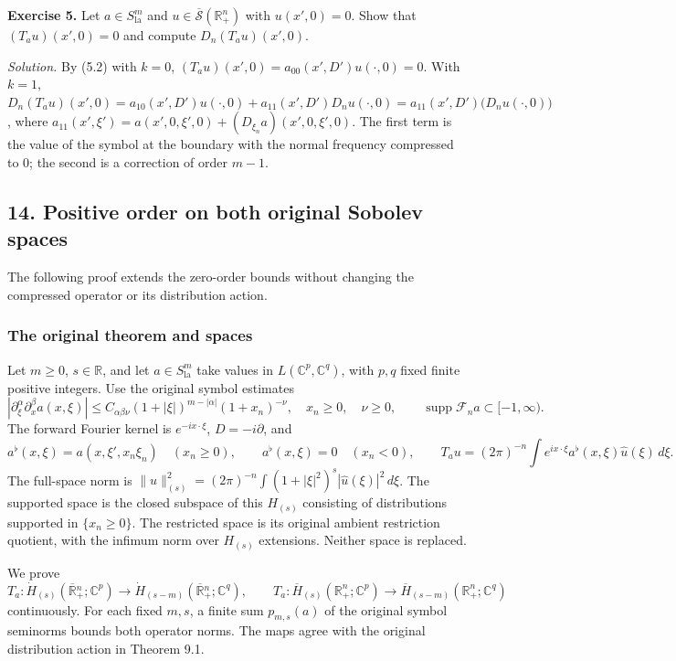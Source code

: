 \documentclass[
  11pt,
]{article}
\begin{document}
\textbf{Exercise 5.} Let \(a\in S^m_{\mathrm{la}}\) and
\(u\in\overline{\mathcal S}(\mathbb R^n_+)\) with \(u(x',0)=0\). Show
that \((T_au)(x',0)=0\) and compute \(D_n(T_au)(x',0)\).

\emph{Solution.} By (5.2) with \(k=0\),
\((T_au)(x',0)=a_{00}(x',D')u(\cdot,0)=0\). With \(k=1\),
\(D_n(T_au)(x',0)=a_{10}(x',D')u(\cdot,0)+a_{11}(x',D')D_nu(\cdot,0)=a_{11}(x',D')\big(D_nu(\cdot,0)\big)\),
where \(a_{11}(x',\xi')=a(x',0,\xi',0)+(D_{\xi_n}a)(x',0,\xi',0)\). The
first term is the value of the symbol at the boundary with the normal
frequency compressed to 0; the second is a correction of order \(m-1\).

\subsection{14. Positive order on both original Sobolev
spaces}\label{positive-order-on-both-original-sobolev-spaces}

The following proof extends the zero-order bounds without changing the
compressed operator or its distribution action.

\subsubsection{The original theorem and
spaces}\label{the-original-theorem-and-spaces}

Let \(m\ge0\), \(s\in\mathbb R\), and let \(a\in S^m_{\mathrm{la}}\)
take values in \(L(\mathbb C^p,\mathbb C^q)\), with \(p,q\) fixed finite
positive integers. Use the original symbol estimates \[
 |\partial_\xi^\alpha\partial_x^\beta a(x,\xi)|
 \le C_{\alpha\beta\nu}
 (1+|\xi|)^{m-|\alpha|}(1+x_n)^{-\nu},
 \quad x_n\ge0,\quad \nu\ge0,
 \qquad
 \operatorname{supp}\mathcal F_n a\subset[-1,\infty).
 \tag{PS1}
\] The forward Fourier kernel is \(e^{-ix\cdot\xi}\), \(D=-i\partial\),
and {\small
\[
 a^\flat(x,\xi)=a(x,\xi',x_n\xi_n)\quad(x_n\ge0),\qquad
 a^\flat(x,\xi)=0\quad(x_n<0),\qquad
 T_a u=(2\pi)^{-n}\int e^{ix\cdot\xi}a^\flat(x,\xi)\widehat u(\xi)\,d\xi .
 \tag{PS2}
\]
} The full-space norm is
\(\|u\|_{(s)}^2=(2\pi)^{-n}\int(1+|\xi|^2)^s|\widehat u(\xi)|^2\,d\xi\).
The supported space is the closed subspace of this \(H_{(s)}\)
consisting of distributions supported in \(\{x_n\ge0\}\). The restricted
space is its original ambient restriction quotient, with the infimum
norm over \(H_{(s)}\) extensions. Neither space is replaced.

We prove \[
 T_a:\dot H_{(s)}(\overline{\mathbb R}{}^n_+;\mathbb C^p)
       \longrightarrow
       \dot H_{(s-m)}(\overline{\mathbb R}{}^n_+;\mathbb C^q),
 \qquad
 T_a:\overline H_{(s)}(\mathbb R^n_+;\mathbb C^p)
       \longrightarrow
       \overline H_{(s-m)}(\mathbb R^n_+;\mathbb C^q)
 \tag{PS3}
\] continuously. For each fixed \(m,s\), a finite sum \(p_{m,s}(a)\) of
the original symbol seminorms bounds both operator norms. The maps agree
with the original distribution action in Theorem 9.1.
\end{document}
